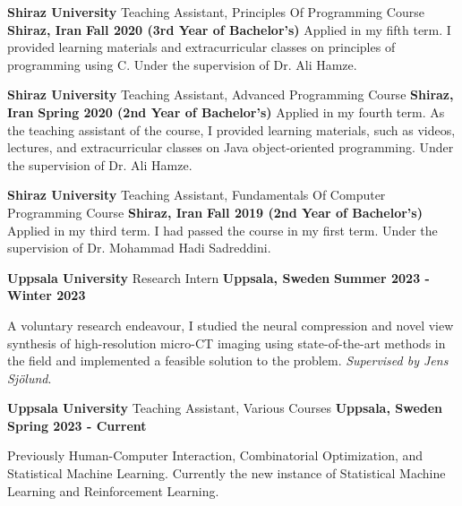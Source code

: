 \begin{cventries}
{    \cventry
    {\textbf{Shiraz University}} %
    {Teaching Assistant, Principles Of Programming Course} %
    {\textbf{Shiraz, Iran}} %
    {\textbf{Fall 2020 (3rd Year of Bachelor’s)}} %
    {
        Applied in my fifth term. I provided learning materials and extracurricular classes on principles of programming using C. Under the supervision of Dr. Ali Hamze.
    }

    \cventry
    {\textbf{Shiraz University}} %
    {Teaching Assistant, Advanced Programming Course} %
    {\textbf{Shiraz, Iran}} %
    {\textbf{Spring 2020 (2nd Year of Bachelor’s)}} %
    {
        Applied in my fourth term. As the teaching assistant of the course, I provided learning materials, such as videos, lectures, and extracurricular classes on Java object-oriented programming. Under the supervision of Dr. Ali Hamze.
    }

    \cventry
    {\textbf{Shiraz University}} %
    {Teaching Assistant, Fundamentals Of Computer Programming Course} %
    {\textbf{Shiraz, Iran}} %
    {\textbf{Fall 2019 (2nd Year of Bachelor’s)}} %
    {
        Applied in my third term. I had passed the course in my first term. Under the supervision of Dr. Mohammad Hadi Sadreddini.
    }
}
{ 
    \cventry
    {\textbf{Uppsala University}} %
    {Research Intern} %
    {\textbf{Uppsala, Sweden}} %
    {\textbf{Summer 2023 - Winter 2023}} %
    {
      \begin{cvitems}
        \item A voluntary research endeavour, I studied the neural compression and novel view synthesis of high-resolution micro-CT imaging using state-of-the-art methods in the field and implemented a feasible solution to the problem. \emph{Supervised by Jens Sjölund}.
      \end{cvitems}
    }

    \cventry
    {\textbf{Uppsala University}} %
    {Teaching Assistant, Various Courses} %
    {\textbf{Uppsala, Sweden}} %
    {\textbf{Spring 2023 - Current}} %
    {
      \begin{cvitems}
        \item Previously Human-Computer Interaction, Combinatorial Optimization, and Statistical Machine Learning. Currently the new instance of Statistical Machine Learning and Reinforcement Learning.
      \end{cvitems}
    }
    
}
\end{cventries}
